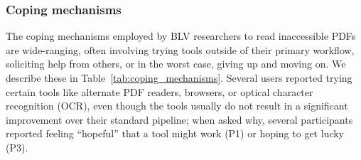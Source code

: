 \begin{table}[t!]
    \label{tab:current_challenges}
\end{table}

\subsubsection*{Coping mechanisms}

The coping mechanisms employed by BLV researchers to read inaccessible PDFs are wide-ranging, often involving trying tools outside of their primary workflow, soliciting help from others, or in the worst case, giving up and moving on. We describe these in Table~\ref{tab:coping_mechanisms}. Several users reported trying certain tools like alternate PDF readers, browsers, or optical character recognition (OCR), even though the tools usually do not result in a significant improvement over their standard pipeline; when asked why, several participants reported feeling ``hopeful'' that a tool might work (P1) or hoping to get lucky (P3).

